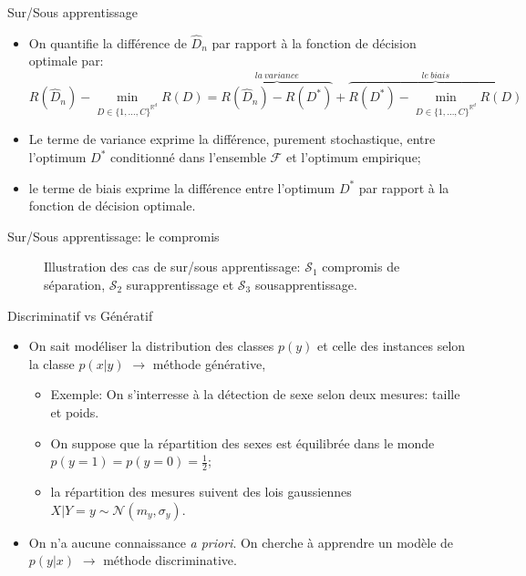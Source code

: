 \documentclass[8pt]{beamer}
\begin{document}
			\begin{frame}{Sur/Sous apprentissage}
				\begin{itemize}
					\item<1-> On quantifie la différence de \(\widehat D_n \) par rapport à la fonction de décision optimale par:
						\begin{equation}
							R(\widehat D_n) - \min_{D \in \{1, \dots, C\}^{\mathbb{R}^d}} R(D) = \overbrace{R(\widehat D_n) - R(D^*)}^{la\ variance} + \overbrace{R(D^*) - \min_{D \in \{1, \dots, C\}^{\mathbb{R}^d}} R(D)}^{le\ biais}
						\end{equation}
					\item<2-> Le terme de variance exprime la différence, purement stochastique, entre l'optimum \(D^*\) conditionné dans l'ensemble \(\mathscr{F}\) et l'optimum empirique;
					\item<3-> le terme de biais exprime la différence entre l'optimum \(D^*\) par rapport à la fonction de décision optimale.
				\end{itemize}
			\end{frame}
			\begin{frame}{Sur/Sous apprentissage: le compromis}
				\begin{figure}[H]
					
					\caption*{Illustration des cas de sur/sous apprentissage: $\mathscr{S}_1$ compromis de séparation, $\mathscr{S}_2$ surapprentissage et $\mathscr{S}_3$ sousapprentissage.}
				\end{figure}
			\end{frame}
			\begin{frame}{Discriminatif vs Génératif}
				\begin{itemize}
					\item<1-> On sait modéliser la distribution des classes $p(y)$ et celle des instances selon la classe $p(x\vert y)$ $\longrightarrow$ méthode générative,
						\begin{itemize}
							\item<2-> Exemple: On s'interresse à la détection de sexe selon deux mesures: taille et poids.
							\item<3-> On suppose que la répartition des sexes est équilibrée dans le monde $p(y=1) = p(y=0) = \frac{1}{2}$;
							\item<4-> la répartition des mesures suivent des lois gaussiennes $X\vert Y=y \sim \mathscr{N}(m_y, \sigma_y)$.
						\end{itemize}
					\item<5-> On n'a aucune connaissance \textit{a priori}. On cherche à apprendre un modèle de $p(y \vert x)$ $\longrightarrow$ méthode discriminative.
				\end{itemize}
			\end{frame}	
\end{document}
